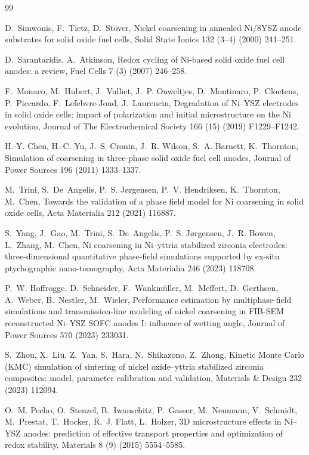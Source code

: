 \documentclass[5p,times,twocolumn]{elsarticle}
\begin{document}
\begin{thebibliography}{99}

D.~Simwonis, F.~Tietz, D.~St\"over,
Nickel coarsening in annealed Ni/8YSZ anode substrates for solid oxide fuel
cells,
Solid State Ionics 132 (3--4) (2000) 241--251.

D.~Sarantaridis, A.~Atkinson,
Redox cycling of Ni-based solid oxide fuel cell anodes: a review,
Fuel Cells 7 (3) (2007) 246--258.

F.~Monaco, M.~Hubert, J.~Vulliet, J.~P. Ouweltjes, D.~Montinaro, P.~Cloetens,
P.~Piccardo, F.~Lefebvre-Joud, J.~Laurencin,
Degradation of Ni--YSZ electrodes in solid oxide cells: impact of polarization
and initial microstructure on the Ni evolution,
Journal of The Electrochemical Society 166 (15) (2019) F1229--F1242.

H.-Y. Chen, H.-C. Yu, J.~S. Cronin, J.~R. Wilson, S.~A. Barnett, K.~Thornton,
Simulation of coarsening in three-phase solid oxide fuel cell anodes,
Journal of Power Sources 196 (2011) 1333--1337.

M.~Trini, S.~De~Angelis, P.~S. J{\o}rgensen, P.~V. Hendriksen, K.~Thornton,
M.~Chen,
Towards the validation of a phase field model for Ni coarsening in solid oxide
cells,
Acta Materialia 212 (2021) 116887.

S.~Yang, J.~Gao, M.~Trini, S.~De~Angelis, P.~S. J{\o}rgensen, J.~R. Bowen,
L.~Zhang, M.~Chen,
Ni coarsening in Ni--yttria stabilized zirconia electrodes: three-dimensional
quantitative phase-field simulations supported by ex-situ ptychographic
nano-tomography,
Acta Materialia 246 (2023) 118708.

P.~W. Hoffrogge, D.~Schneider, F.~Wankm\"uller, M.~Meffert, D.~Gerthsen,
A.~Weber, B.~Nestler, M.~Wieler,
Performance estimation by multiphase-field simulations and transmission-line
modeling of nickel coarsening in FIB-SEM reconstructed Ni--YSZ SOFC anodes I:
influence of wetting angle,
Journal of Power Sources 570 (2023) 233031.

S.~Zhou, X.~Liu, Z.~Yan, S.~Hara, N.~Shikazono, Z.~Zhong,
Kinetic Monte Carlo (KMC) simulation of sintering of nickel oxide--yttria
stabilized zirconia composites: model, parameter calibration and validation,
Materials \& Design 232 (2023) 112094.

O.~M. Pecho, O.~Stenzel, B.~Iwanschitz, P.~Gasser, M.~Neumann, V.~Schmidt,
M.~Prestat, T.~Hocker, R.~J. Flatt, L.~Holzer,
3D microstructure effects in Ni--YSZ anodes: prediction of effective transport
properties and optimization of redox stability,
Materials 8 (9) (2015) 5554--5585.


\end{thebibliography}
\end{document}
